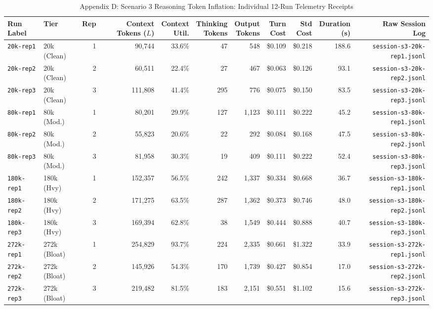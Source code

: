 \documentclass[10pt,twocolumn,a4paper]{article}
\begin{document}
\begin{table}[t]
\caption{Appendix D: Scenario 3 Reasoning Token Inflation: Individual 12-Run Telemetry Receipts}
\label{tab:app_scenario3_runs}
\centering
\scriptsize
\setlength{\tabcolsep}{2.0pt}
\begin{tabular}{@{}llrrrrrrrrr@{}}
\toprule
\textbf{Run Label} & \textbf{Tier} & \textbf{Rep} & \shortstack{\textbf{Context}\\\textbf{Tokens ($L$)}} & \shortstack{\textbf{Context}\\\textbf{Util.}} & \shortstack{\textbf{Thinking}\\\textbf{Tokens}} & \shortstack{\textbf{Output}\\\textbf{Tokens}} & \shortstack{\textbf{Turn}\\\textbf{Cost}} & \shortstack{\textbf{Std}\\\textbf{Cost}} & \shortstack{\textbf{Duration}\\\textbf{(s)}} & \shortstack{\textbf{Raw Session}\\\textbf{Log}} \\
\midrule
\texttt{20k-rep1} & 20k (Clean) & 1 & 90,744 & 33.6\% & 47 & 548 & \$0.109 & \$0.218 & 188.6 & \texttt{session-s3-20k-rep1.jsonl} \\
\texttt{20k-rep2} & 20k (Clean) & 2 & 60,511 & 22.4\% & 27 & 467 & \$0.063 & \$0.126 & 93.1 & \texttt{session-s3-20k-rep2.jsonl} \\
\texttt{20k-rep3} & 20k (Clean) & 3 & 111,808 & 41.4\% & 295 & 776 & \$0.075 & \$0.150 & 83.5 & \texttt{session-s3-20k-rep3.jsonl} \\
\texttt{80k-rep1} & 80k (Mod.) & 1 & 80,201 & 29.9\% & 127 & 1,123 & \$0.111 & \$0.222 & 45.2 & \texttt{session-s3-80k-rep1.jsonl} \\
\texttt{80k-rep2} & 80k (Mod.) & 2 & 55,823 & 20.6\% & 22 & 292 & \$0.084 & \$0.168 & 47.5 & \texttt{session-s3-80k-rep2.jsonl} \\
\texttt{80k-rep3} & 80k (Mod.) & 3 & 81,958 & 30.3\% & 19 & 409 & \$0.111 & \$0.222 & 52.4 & \texttt{session-s3-80k-rep3.jsonl} \\
\texttt{180k-rep1} & 180k (Hvy) & 1 & 152,357 & 56.5\% & 242 & 1,337 & \$0.334 & \$0.668 & 36.7 & \texttt{session-s3-180k-rep1.jsonl} \\
\texttt{180k-rep2} & 180k (Hvy) & 2 & 171,275 & 63.5\% & 287 & 1,362 & \$0.373 & \$0.746 & 48.0 & \texttt{session-s3-180k-rep2.jsonl} \\
\texttt{180k-rep3} & 180k (Hvy) & 3 & 169,394 & 62.8\% & 38 & 1,549 & \$0.444 & \$0.888 & 40.7 & \texttt{session-s3-180k-rep3.jsonl} \\
\texttt{272k-rep1} & 272k (Bloat) & 1 & 254,829 & 93.7\% & 224 & 2,335 & \$0.661 & \$1.322 & 33.9 & \texttt{session-s3-272k-rep1.jsonl} \\
\texttt{272k-rep2} & 272k (Bloat) & 2 & 145,926 & 54.3\% & 170 & 1,739 & \$0.427 & \$0.854 & 17.0 & \texttt{session-s3-272k-rep2.jsonl} \\
\texttt{272k-rep3} & 272k (Bloat) & 3 & 219,482 & 81.5\% & 183 & 2,151 & \$0.551 & \$1.102 & 15.6 & \texttt{session-s3-272k-rep3.jsonl} \\
\bottomrule
\end{tabular}
\end{table}
\end{document}
